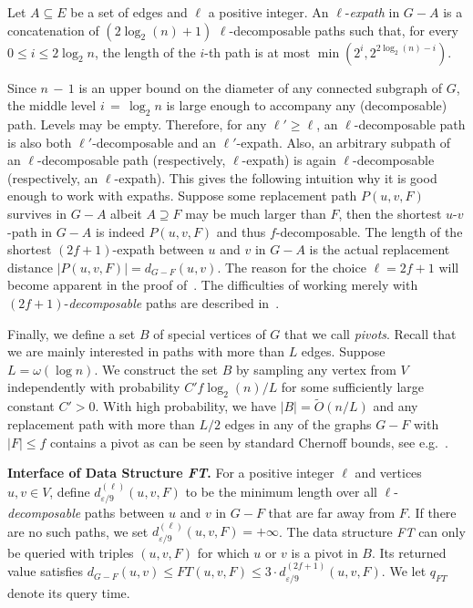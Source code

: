 \documentclass{article}\usepackage[a4paper,margin=20mm]{geometry}
\newcommand*{\Otilde}{\widetilde{O}}
\renewcommand{\le}{\leqslant}
\renewcommand{\ge}{\geqslant}
\newcommand{\eps}{\varepsilon}
\begin{document}
\begin{definition}
\label{def:l-expath}
  Let $A \subseteq E$ be a set of edges and $\ell$ a positive integer.
  An $\ell$-\emph{expath} in $G-A$ is a concatenation of $(2\log_2(n)+1)$
  $\ell$-decomposable paths
  such that, for every $0 \le i \le 2\log_2 n$,
  the length of the $i$-th path is at most $\min(2^i, 2^{2\log_2(n) - i})$.
\end{definition}

Since $n\,{-}\,1$ is an upper bound on the diameter of any connected subgraph of $G$,
the middle level $i \,{=}\, \log_2 n$ is large enough to accompany any (decomposable) path.
Levels may be empty.
Therefore, for any $\ell' \ge \ell$, an $\ell$-decomposable path is also both $\ell'$-decomposable
and an $\ell'$-expath.
Also, an arbitrary subpath of an $\ell$-decomposable path 
(respectively, \mbox{$\ell$-expath}) is again $\ell$-decomposable (respectively, an \mbox{$\ell$-expath}).
This gives the following intuition why it is good enough to work with expaths.
Suppose some replacement path $P(u,v,F)$ survives in $G{-}A$
albeit $A \supseteq F$ may be much larger than $F$, 
then the shortest $u$-$v$-path in $G-A$ is indeed $P(u,v,F)$ and thus $f$-decomposable.
The length of the shortest $(2f{+}1)$-expath
between $u$ and $v$ in $G{-}A$ is the actual replacement distance $|P(u,v,F)| = d_{G-F}(u,v)$.
The reason for the choice $\ell = 2f+1$ will become apparent in the proof of~.
The difficulties of working merely with $(2f{+}1)$-\emph{decomposable} paths are described in~.

Finally, we define a set $B$ of special vertices of $G$ that we call \emph{pivots}.
Recall that we are mainly interested in paths with more than $L$ edges.
Suppose $L = \omega(\log n)$.
We construct the set $B$ by sampling any vertex from $V$ independently with probability
$C' f \log_2(n)/L$ for some sufficiently large constant $C' > 0$.
With high probability, we have $|B| = \Otilde(n/L)$
and any replacement path with more than $L/2$ edges
in any of the graphs $G-F$ with $|F| \le f$
contains a pivot as can be seen by standard Chernoff bounds,
see e.g.~\cite{GrandoniVWilliamsFasterRPandDSO_journal,RodittyZwick12kSimpleShortestPaths,WY13}.
\vspace*{.5em}

\noindent
\textbf{Interface of Data Structure \emph{FT}.}
For a positive integer $\ell$ and vertices $u,v \in V$,
define $d^{(\ell)}_{\eps/9}(u,v,F)$
to be the minimum length over all $\ell$-\emph{decomposable} paths
between $u$ and $v$ in $G-F$ that are far away from $F$.
If there are no such paths, we set $d^{(\ell)}_{\eps/9}(u,v,F) = +\infty$.
The data structure \emph{FT} can only be queried with triples $(u,v,F)$
for which $u$ or $v$ is a pivot in $B$.
Its returned value satisfies
$d_{G-F}(u,v) \le FT(u,v,F) \le 3 \cdot d^{(2f+1)}_{\eps/9}(u,v,F)$.
We let $q_{FT}$ denote its query time.
\end{document}
